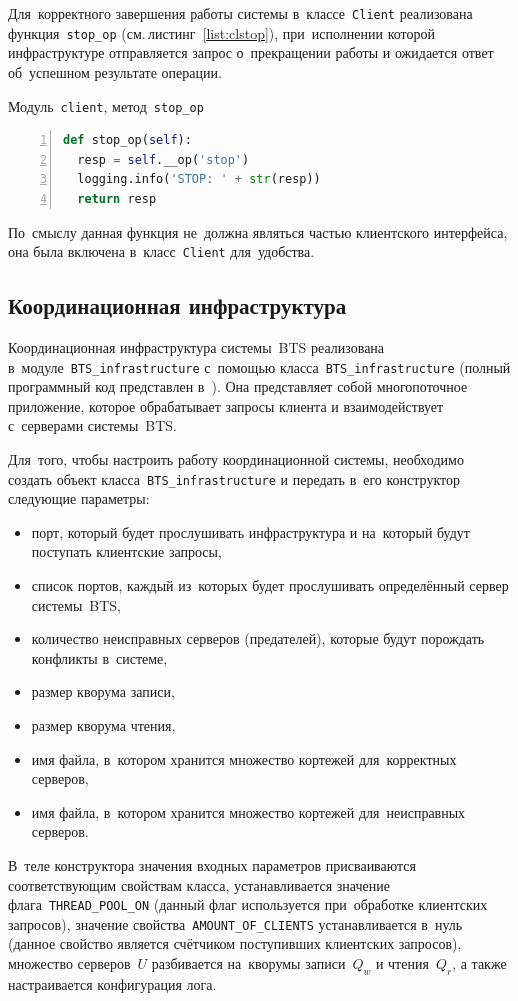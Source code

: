 Для~корректного завершения работы системы в~классе~\texttt{Client} реализована функция~\texttt{stop_op} (см.\,листинг~\ref{list:clstop}), при~исполнении которой инфраструктуре отправляется запрос о~прекращении работы и ожидается ответ об~успешном результате операции.
\begin{ListingEnv}\caption{Модуль~\texttt{client}, метод~\texttt{stop_op}}\label{list:clstop}
	\begin{lstlisting}[language=Python, numbers=left]
def stop_op(self):
  resp = self.__op('stop')
  logging.info('STOP: ' + str(resp))
  return resp
	\end{lstlisting}
\end{ListingEnv}
По~смыслу данная функция не~должна являться частью клиентского интерфейса, она была включена в~класс~\texttt{Client} для~удобства.


\subsection{Координационная инфраструктура}\label{subsec:4}
Координационная инфраструктура системы~BTS реализована в~модуле~\texttt{BTS_infrastructure} с~помощью класса~\texttt{BTS_infrastructure} (полный программный код представлен в~\autocite{mybts}). Она представляет собой многопоточное приложение, которое обрабатывает запросы клиента и взаимодействует с~серверами системы~BTS.

Для~того, чтобы настроить работу координационной системы, необходимо создать объект класса~\texttt{BTS_infrastructure} и передать в~его конструктор следующие параметры:
\begin{itemize}
	\item порт, который будет прослушивать инфраструктура и на~который будут поступать клиентские запросы,
	\item список портов, каждый из~которых будет прослушивать определённый сервер системы~BTS,
	\item количество неисправных серверов (предателей), которые будут порождать конфликты в~системе,
	\item размер кворума записи,
	\item размер кворума чтения,
	\item имя файла, в~котором хранится множество кортежей для~корректных серверов,
	\item имя файла, в~котором хранится множество кортежей для~неисправных серверов.
\end{itemize}
В~теле конструктора значения входных параметров присваиваются соответствующим свойствам класса, устанавливается значение флага~\texttt{THREAD_POOL_ON} (данный флаг используется при~обработке клиентских запросов), значение свойства~\texttt{AMOUNT_OF_CLIENTS} устанавливается в~нуль (данное свойство является счётчиком поступивших клиентских запросов), множество серверов~$U$ разбивается на~кворумы записи~$Q_w$ и чтения~$Q_r$, а также настраивается конфигурация лога.

